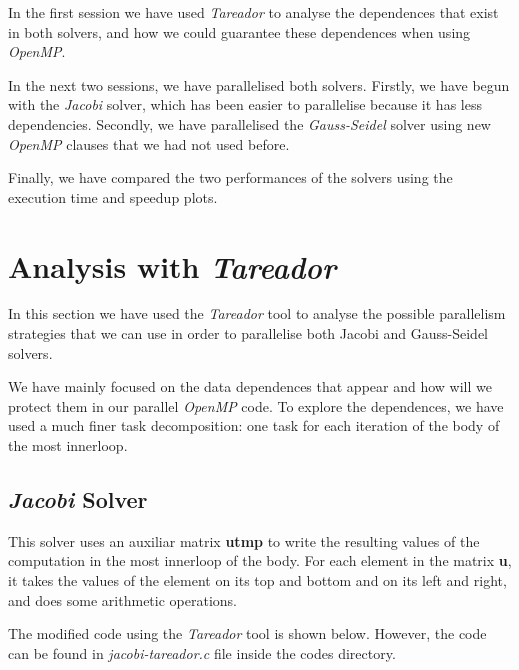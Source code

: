 \documentclass[12pt, a4paper]{article}
\begin{document}
In the first session we have used \textit{Tareador} to analyse the dependences that exist in both solvers, and how we could guarantee these dependences when using \textit{OpenMP}.

In the next two sessions, we have parallelised both solvers. Firstly, we have begun with the \textit{Jacobi} solver, which has been easier to parallelise because it has less dependencies. Secondly, we have parallelised the \textit{Gauss-Seidel} solver using new \textit{OpenMP} clauses that we had not used before.

Finally, we have compared the two performances of the solvers using the execution time and speedup plots.

\newpage

\section{Analysis with \textit{Tareador}}

In this section we have used the \textit{Tareador} tool to analyse the possible parallelism strategies that we can use in order to parallelise both Jacobi and Gauss-Seidel solvers. 

We have mainly focused on the data dependences that appear and how will we protect them in our parallel \textit{OpenMP} code. To explore the dependences, we have used a much finer task decomposition: one task for each iteration of the body of the most innerloop.

\subsection{\textit{Jacobi} Solver}

This solver uses an auxiliar matrix \textbf{utmp} to write the resulting values of the computation in the most innerloop of the body. For each element in the matrix \textbf{u}, it takes the values of the element on its top and bottom and on its left and right, and does some arithmetic operations.

The modified code using the \textit{Tareador} tool is shown below. However, the code can be found in \textit{jacobi-tareador.c} file inside the codes directory.
\end{document}
